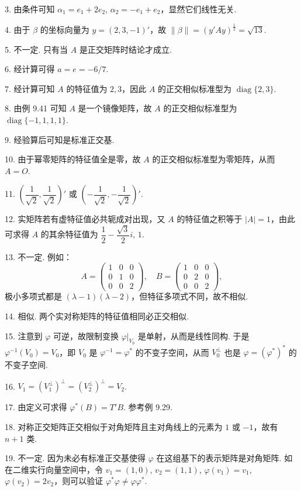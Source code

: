 \documentclass[UTF8, 12pt, fontset=fandol, oneside]{ctexart}
\begin{document}
3. 由条件可知 $\alpha_1=e_1+2e_2$, $\alpha_2=-e_1+e_2$，显然它们线性无关.

4. 由于 $\beta$ 的坐标向量为 $y=(2,3,-1)'$，故 $\|\beta\|=(y'Ay)^{\frac{1}{2}}=\sqrt{13}$.

5. 不一定. 只有当 $A$ 是正交矩阵时结论才成立.

6. 经计算可得 $a=e=-6/7$.

7. 经计算可知 $A$ 的特征值为 $2,3$，因此 $A$ 的正交相似标准型为 $\operatorname{diag}\{2,3\}$.

8. 由例 9.41 可知 $A$ 是一个镜像矩阵，故 $A$ 的正交相似标准型为 $\operatorname{diag}\{-1,1,1,1\}$.

9. 经验算后可知是标准正交基.

10. 由于幂零矩阵的特征值全是零，故 $A$ 的正交相似标准型为零矩阵，从而 $A=O$.

11. $\left(\dfrac{1}{\sqrt{2}},\dfrac{1}{\sqrt{2}}\right)'$ 或 $\left(-\dfrac{1}{\sqrt{2}},-\dfrac{1}{\sqrt{2}}\right)'$.

12. 实矩阵若有虚特征值必共轭成对出现，又 $A$ 的特征值之积等于 $|A|=1$，由此可求得 $A$ 的其余特征值为 $\dfrac{1}{2}-\dfrac{\sqrt{3}}{2}i$, $1$.

13. 不一定. 例如：
\[
A=\begin{pmatrix}
1&0&0\\
0&1&0\\
0&0&2
\end{pmatrix},\quad
B=\begin{pmatrix}
1&0&0\\
0&2&0\\
0&0&2
\end{pmatrix},
\]
极小多项式都是 $(\lambda-1)(\lambda-2)$，但特征多项式不同，故不相似.

14. 相似. 两个实对称矩阵的特征值相同必正交相似.

15. 注意到 $\varphi$ 可逆，故限制变换 $\varphi|_{V_0}$ 是单射，从而是线性同构. 于是 $\varphi^{-1}(V_0)=V_0$，即 $V_0$ 是 $\varphi^{-1}=\varphi^*$ 的不变子空间，从而 $V_0^\perp$ 也是 $\varphi=(\varphi^*)^*$ 的不变子空间.

16. $V_1=(V_1^\perp)^\perp=(V_2^\perp)^\perp=V_2$.

17. 由定义可求得 $\varphi^*(B)=T'B$. 参考例 9.29.

18. 对称正交矩阵正交相似于对角矩阵且主对角线上的元素为 $1$ 或 $-1$，故有 $n+1$ 类.

19. 不一定. 因为未必有标准正交基使得 $\varphi$ 在这组基下的表示矩阵是对角矩阵. 如在二维实行向量空间中，令 $v_1=(1,0)$, $v_2=(1,1)$, $\varphi(v_1)=v_1$, $\varphi(v_2)=2v_2$，则可以验证 $\varphi^*\varphi\ne\varphi\varphi^*$.
\end{document}
